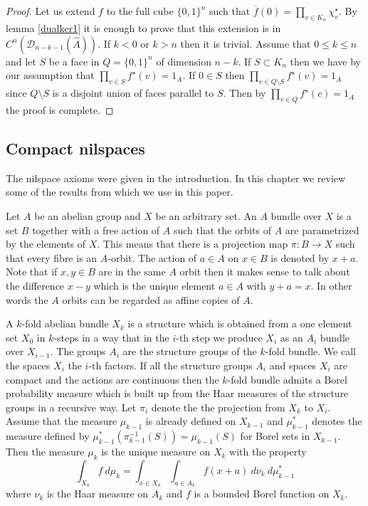 \documentclass [11pt] {article}
\def\con{\star}
\begin{document}
\begin{proof} Let us extend $f$ to the full cube $\{0,1\}^n$ such that $\overline{f}(0)=\prod_{v\in K_n}\chi_v^\con$. 
By lemma \ref{dualker1} it is enough to prove that this extension is in $C^n(\mathcal{D}_{n-k-1}(\hat{A}))$. If $k<0$ or $k>n$ then it is trivial. Assume that $0\leq k\leq n$ and
let $S$ be a face in $Q=\{0,1\}^n$ of dimension $n-k$. If $S\subset K_n$ then we have by our assumption that $\prod_{v\in S}f^\con(v)=1_A$. If $0\in S$ then $\prod_{v\in Q\setminus S}f^\con(v)=1_A$ since $Q\setminus S$ is a disjoint union of faces parallel to $S$. Then by $\prod_{v\in Q}f^\con(c)=1_A$ the proof is complete.
\end{proof}

\medskip

  
\subsection{Compact nilspaces}

The nilspace axioms were given in the introduction. 
In this chapter we review some of the results from \cite{NP} which we use in this paper.

Let $A$ be an abelian group and $X$ be an arbitrary set. An $A$ bundle over $X$ is a set $B$ together with a free action of $A$ such that the orbits of $A$ are parametrized by the elements of $X$. This means that there is a projection map $\pi:B\rightarrow X$ such that every fibre is an $A$-orbit. 
The action of $a\in A$ on $x\in B$ is denoted by $x+a$. Note that if $x,y\in B$ are in the same $A$ orbit then it makes sense to talk about the difference $x-y$ which is the unique element $a\in A$ with $y+a=x$. In other words the $A$ orbits can be regarded as affine copies of $A$.

A $k$-fold abelian bundle $X_k$ is a structure which is obtained from a one element set $X_0$ in $k$-steps in a way that in the $i$-th step we produce $X_i$ as an $A_i$ bundle over $X_{i-1}$.
The groups $A_i$ are the structure groups of the $k$-fold bundle. We call the spaces $X_i$ the $i$-th factors. 
If all the structure groups $A_i$ and spaces $X_i$ are compact and the actions are continuous then the $k$-fold bundle admits a Borel probability measure which is built up from the Haar measures of the structure groups in a recursive way. Let $\pi_i$ denote the the projection from $X_k$ to $X_i$.
Assume that the measure $\mu_{k-1}$ is already defined on $X_{k-1}$ and $\mu_{k-1}^*$ denotes the measure defined by $\mu^*_{k-1}(\pi_{k-1}^{-1}(S))=\mu_{k-1}(S)$ for Borel sets in $X_{k-1}$. Then the measure $\mu_k$ is the unique measure on $X_k$ with the property $$\int_{X_k} f ~d\mu_k=\int_{x\in X_k}\int_{a\in A_k} f(x+a)~d\nu_k~d\mu^*_{k-1}$$ where $\nu_k$ is the Haar measure on $A_k$ and $f$ is a bounded Borel function on $X_k$.
\end{document}
